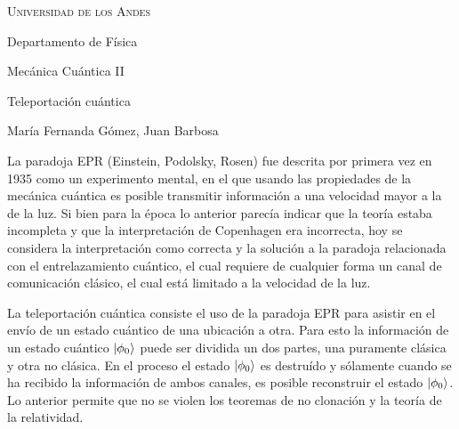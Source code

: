 \documentclass[11pt]{article}
\begin{document}
	{
		\centering
		\scshape
		\LARGE
		Universidad de los Andes
		
		\large
		Departamento de F\'isica
		
		Mec\'anica Cu\'antica II
		
		\vspace{1cm}
		\Large
		Teleportaci\'on cu\'antica
		
		\normalsize
		Mar\'ia Fernanda G\'omez, Juan Barbosa
		
		\vspace{1cm}
	}
	
	La paradoja EPR (Einstein, Podolsky, Rosen) fue descrita por primera vez en 1935 como un experimento mental, en el que usando las propiedades de la mec\'anica cu\'antica es posible transmitir informaci\'on a una velocidad mayor a la de la luz. Si bien para la \'epoca lo anterior parec\'ia indicar que la teor\'ia estaba incompleta y que la interpretaci\'on de Copenhagen era incorrecta, hoy se considera la interpretaci\'on como correcta y la soluci\'on a la paradoja relacionada con el entrelazamiento cu\'antico, el cual requiere de cualquier forma un canal de comunicaci\'on cl\'asico, el cual est\'a limitado a la velocidad de la luz.
	
	La teleportaci\'on cu\'antica consiste el uso de la paradoja EPR para asistir en el env\'io de un estado cu\'antico de una ubicaci\'on a otra. Para esto la informaci\'on de un estado cu\'antico $\ket{\phi_0}$ puede ser dividida un dos partes, una puramente cl\'asica y otra no cl\'asica. En el proceso el estado $\ket{\phi_0}$ es destru\'ido y s\'olamente cuando se ha recibido la informaci\'on de ambos canales, es posible reconstruir el estado $\ket{\phi_0}$. Lo anterior permite que no se violen los teoremas de no clonaci\'on y la teor\'ia de la relatividad.
	
	\nocite{*}
	
	
\end{document}
